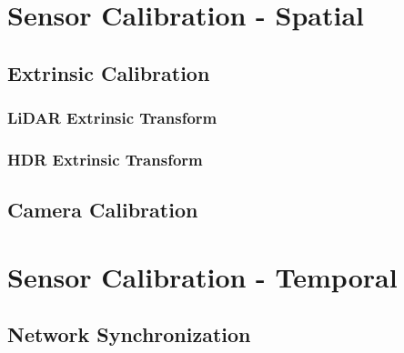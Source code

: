\documentclass{erauthesis}
\begin{document}
\section{Sensor Calibration - Spatial}


\subsection{Extrinsic Calibration} \label{calibration_extrinsic}

\subsubsection{LiDAR Extrinsic Transform} \label{lidar_extrinsic}

\subsubsection{HDR Extrinsic Transform} \label{HDR_extrinsic}

\subsection{Camera Calibration} \label{HDR_intrinsic}

\section{Sensor Calibration - Temporal}


\subsection{Network Synchronization} \label{time_sync_lan}

\end{document}

